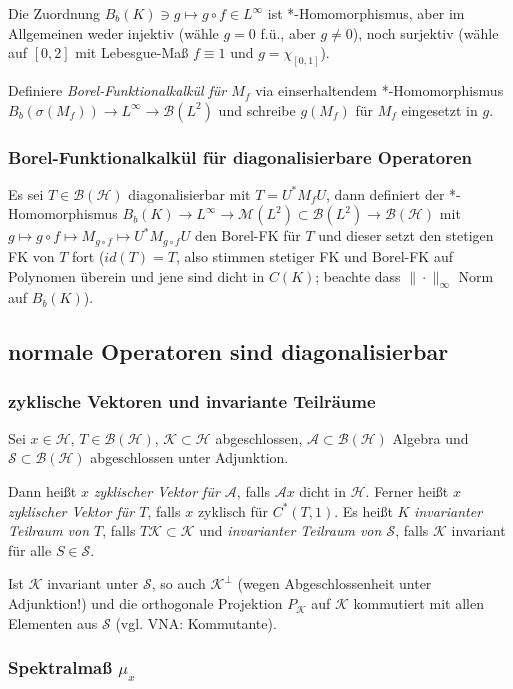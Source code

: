 \documentclass[11pt,a4paper]{scrartcl}
\newcommand{\Hc}{\mathcal{H}}
\newcommand{\Sc}{\mathcal{S}}
\newcommand{\Kc}{\mathcal{K}}
\newcommand{\A}{\mathcal{A}}
\newcommand{\B}{\mathcal{B}}
\newcommand{\M}{\mathcal{M}}
\theoremstyle{plain}
\theoremstyle{definition}
\theoremstyle{remark}
\begin{document}
Die Zuordnung $B_b(K) \ni g \mapsto g\circ f \in L^\infty$ ist *-Homomorphismus, aber im Allgemeinen weder injektiv (wähle $g=0$ f.ü., aber $g\neq 0$), noch surjektiv (wähle auf $[0,2]$ mit Lebesgue-Maß $f\equiv 1$ und $g=\chi_{[0,1]}$).

Definiere \emph{Borel-Funktionalkalkül für $M_f$} via einserhaltendem *-Homomorphismus $B_b(\sigma(M_f)) \to L^\infty \to \B(L^2)$ und schreibe $g(M_f)$ für $M_f$ eingesetzt in $g$. 

\subsubsection{Borel-Funktionalkalkül für diagonalisierbare Operatoren}

Es sei $T\in \B(\Hc)$ diagonalisierbar mit $T=U^*M_f U$, dann definiert der *-Homomorphismus $B_b(K)\to L^\infty \to \M(L^2) \subset \B(L^2) \to \B(\Hc)$ mit $g\mapsto g\circ f \mapsto M_{g\circ f} \mapsto U^* M_{g\circ f} U$ den Borel-FK für $T$ und dieser setzt den stetigen FK von $T$ fort ($id(T)=T$, also stimmen stetiger FK und Borel-FK auf Polynomen überein und jene sind dicht in $C(K)$; beachte dass $\|\cdot\|_\infty$ Norm auf $B_b(K)$).

\subsection{normale Operatoren sind diagonalisierbar}

\subsubsection{zyklische Vektoren und invariante Teilräume}

Sei $x\in \Hc$, $T\in \B(\Hc)$, $\Kc \subset \Hc$ abgeschlossen, $\A \subset \B(\Hc)$ Algebra und $\Sc \subset \B(\Hc)$ abgeschlossen unter Adjunktion.

Dann heißt $x$ \emph{zyklischer Vektor für $\A$}, falls $\A x$ dicht in $\Hc$. Ferner heißt $x$ \emph{zyklischer Vektor für $T$}, falls $x$ zyklisch für $C^*(T,1)$. Es heißt $K$ \emph{invarianter Teilraum von $T$}, falls $T\Kc \subset \Kc$ und \emph{invarianter Teilraum von $\Sc$}, falls $\Kc$ invariant für alle $S\in \Sc$. 

Ist $\Kc$ invariant unter $\Sc$, so auch $\Kc^\bot$ (wegen Abgeschlossenheit unter Adjunktion!) und die orthogonale Projektion $P_\Kc$ auf $\Kc$ kommutiert mit allen Elementen aus $\Sc$ (vgl. VNA: Kommutante).

\subsubsection{Spektralmaß $\mu_x$}
\end{document}
